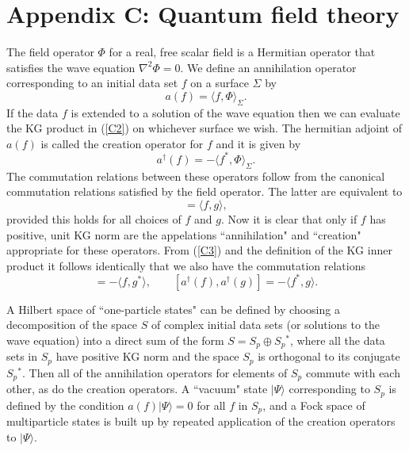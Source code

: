 \documentclass[12pt]{article}
\def\la{\langle}
\def\ra{\rangle}
\begin{document}
\section*{Appendix C: Quantum field theory}

The field operator $\Phi$ for a real, free scalar field
is a Hermitian operator that satisfies
the wave equation $\nabla^2\Phi=0$. We define an
annihilation operator corresponding to an initial data set
$f$ on a surface $\Sigma$ by
\begin{equation}
a(f)=\la f,\Phi\ra_\Sigma.
\label{C2}
\end{equation}
If the data $f$ is extended to a solution of the wave
equation then we can evaluate the KG product in (\ref{C2}) on
whichever surface we wish. The hermitian adjoint of $a(f)$
is called the creation operator for $f$ and it is given by
\begin{equation}
a^{\dagger}(f)=-\la f^*,\Phi\ra_\Sigma.
\end{equation}
The commutation relations between these operators follow
from the canonical commutation relations satisfied by the
field operator. The latter are equivalent to
\begin{equation}
 [a(f),a^{\dagger}(g)]=\la f, g\ra,
\label{C3}
\end{equation}
provided this holds for all choices of $f$ and $g$.
Now it is clear that only if $f$ has positive, unit KG norm
are the appelations ``annihilation" and ``creation"
appropriate for these operators.
{}From (\ref{C3}) and the definition of the KG inner product
it follows identically that we also have the commutation
relations
\begin{equation}
[a(f),a(g)]=-\la f, g^*\ra,\qquad
[a^{\dagger}(f),a^{\dagger}(g)]=-\la f^*, g\ra.
\end{equation}

A Hilbert space of ``one-particle states" can be defined by
choosing a decomposition of the space $S$ of complex
initial data sets (or solutions to the wave equation) into a
direct sum of the form $S=S_p\oplus S_p{}^*$, where all the
data sets in $S_p$ have positive KG norm and the space $S_p$
is orthogonal to its conjugate $S_p{}^*$. Then all of the
annihilation operators for elements of $S_p$ commute with
each other, as do the creation operators. A ``vacuum" state
$|\Psi\ra$ corresponding to $S_p$ is defined by the condition
$a(f)|\Psi\ra=0$ for all $f$ in $S_p$, and a Fock space of
multiparticle states is built up by repeated application
of the creation operators to $|\Psi\ra$.
\end{document}

